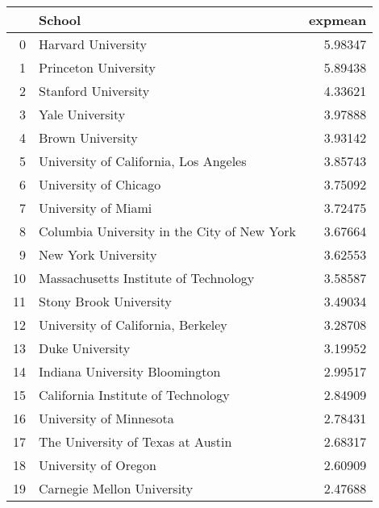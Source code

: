 \begin{tabular}{rlr}
\hline
     & School                                                         &   expmean \\
\hline
   0 & Harvard University                                             &  5.98347  \\
   1 & Princeton University                                           &  5.89438  \\
   2 & Stanford University                                            &  4.33621  \\
   3 & Yale University                                                &  3.97888  \\
   4 & Brown University                                               &  3.93142  \\
   5 & University of California, Los Angeles                          &  3.85743  \\
   6 & University of Chicago                                          &  3.75092  \\
   7 & University of Miami                                            &  3.72475  \\
   8 & Columbia University in the City of New York                    &  3.67664  \\
   9 & New York University                                            &  3.62553  \\
  10 & Massachusetts Institute of Technology                          &  3.58587  \\
  11 & Stony Brook University                                         &  3.49034  \\
  12 & University of California, Berkeley                             &  3.28708  \\
  13 & Duke University                                                &  3.19952  \\
  14 & Indiana University Bloomington                                 &  2.99517  \\
  15 & California Institute of Technology                             &  2.84909  \\
  16 & University of Minnesota                                        &  2.78431  \\
  17 & The University of Texas at Austin                              &  2.68317  \\
  18 & University of Oregon                                           &  2.60909  \\
  19 & Carnegie Mellon University                                     &  2.47688  \\

\end{tabular}
